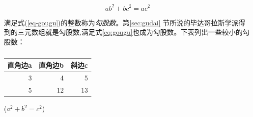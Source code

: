 \documentclass[UTF8]{ctexart}
\begin{document}
	\begin{equation}\label{eq:gougu}
		ab^2+bc^2=ac^2
	\end{equation}
	
	满足式(\ref{eq-gougu})的整数称为\emph{勾股数}。第\ref{sec:gudai}%
	节所说的毕达哥拉斯学派得到的三元数组就是勾股数,满足式\eqref{eq:gougu}也成为勾股数。下表列出一些较小的勾股数：
	\begin{table}[H] %
		\centering
		\begin{tabular}{|r r r|}
			\hline
			直角边a & 直角边b & 斜边c\\
			\hline
			3 &4 & 5 \\
			5 & 12 & 13 \\
			\hline
		\end{tabular}%
		\qquad  %
		($a^2+b^2=c^2$)
		\caption{}
		\label{fig:1}
	\end{table}
		
		

	
	\nocite{Shiye}
	
\end{document}
